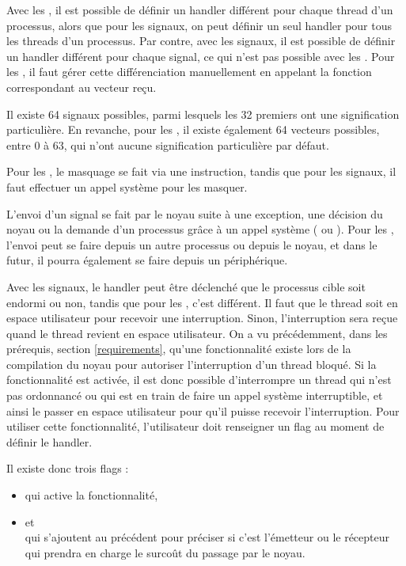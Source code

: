 Avec les \uintr{}, il est possible de définir un handler différent pour chaque thread d'un processus,
alors que pour les signaux, on peut définir un seul handler pour tous les threads d'un processus.
Par contre, avec les signaux, il est possible de définir un handler différent pour chaque signal,
ce qui n'est pas possible avec les \uintr{}.
Pour les \uintr{}, il faut gérer cette différenciation manuellement en appelant la fonction correspondant au vecteur reçu.

Il existe 64 signaux possibles, parmi lesquels les 32 premiers ont une signification particulière.
En revanche, pour les \uintr{}, il existe également 64 vecteurs possibles, entre 0 à 63, qui n'ont aucune signification particulière par défaut.

Pour les \uintr{}, le masquage se fait via une instruction, tandis que pour les signaux, il faut effectuer un appel système pour les masquer.

L'envoi d'un signal se fait par le noyau suite à une exception, une décision du noyau ou la demande d'un processus grâce à un appel système ( ou ).
Pour les \uintr{}, l'envoi peut se faire depuis un autre processus ou depuis le noyau, et dans le futur, il pourra également se faire depuis un périphérique.

Avec les signaux, le handler peut être déclenché que le processus cible soit endormi ou non, tandis que pour les \uintr{}, c'est différent.
Il faut que le thread soit en espace utilisateur pour recevoir une interruption.
Sinon, l'interruption sera reçue quand le thread revient en espace utilisateur.
On a vu précédemment, dans les prérequis, section \ref{requirements}, qu'une fonctionnalité existe lors de la compilation du noyau pour autoriser l'interruption d'un thread bloqué.
Si la fonctionnalité est activée, il est donc possible d'interrompre un thread qui n'est pas ordonnancé ou qui est en train de faire un appel système interruptible,
et ainsi le passer en espace utilisateur pour qu'il puisse recevoir l'interruption. %
Pour utiliser cette fonctionnalité, l'utilisateur doit renseigner un flag au moment de définir le handler.

Il existe donc trois flags :
\begin{itemize}
  \item {} qui active la fonctionnalité,
  \item {} et\\
  qui s'ajoutent au précédent pour préciser si c'est l'émetteur ou le récepteur qui prendra en charge le surcoût du passage par le noyau.
\end{itemize}

